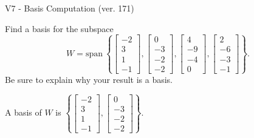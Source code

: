 \begin{exercise}
  \begin{exerciseTitle}V7 - Basis Computation (ver. 171)\end{exerciseTitle}
  \begin{exerciseStatement}
    Find a basis for the subspace 
\[W=\mathrm{span}\ \left\{\left[\begin{array}{r}
-2 \\
3 \\
1 \\
-1
\end{array}\right] , \left[\begin{array}{r}
0 \\
-3 \\
-2 \\
-2
\end{array}\right] , \left[\begin{array}{r}
4 \\
-9 \\
-4 \\
0
\end{array}\right] , \left[\begin{array}{r}
2 \\
-6 \\
-3 \\
-1
\end{array}\right]\right\}.\]
 Be sure to explain why your result is a basis.


  \end{exerciseStatement}
  \begin{exerciseAnswer}
   A basis of \(W\) is  \(\left\{\left[\begin{array}{r}
-2 \\
3 \\
1 \\
-1
\end{array}\right] , \left[\begin{array}{r}
0 \\
-3 \\
-2 \\
-2
\end{array}\right]\right\}\).
  


  \end{exerciseAnswer}
\end{exercise}